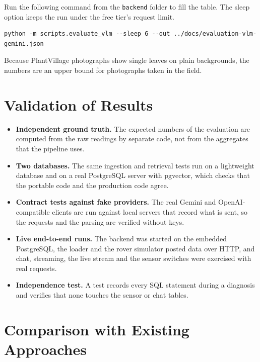 \noindent Run the following command from the \texttt{backend} folder to fill the table. The sleep option keeps the run under the free tier's request limit.

\begin{lstlisting}
python -m scripts.evaluate_vlm --sleep 6 --out ../docs/evaluation-vlm-gemini.json
\end{lstlisting}

\noindent Because PlantVillage photographs show single leaves on plain backgrounds, the
numbers are an upper bound for photographs taken in the field.

\section{Validation of Results}

\begin{itemize}
\item \textbf{Independent ground truth.} The expected numbers of the evaluation are computed from the raw readings by separate code, not
      from the aggregates that the pipeline uses.
\item \textbf{Two databases.} The same ingestion and retrieval tests run on a lightweight database and on a real PostgreSQL server with pgvector,
      which checks that the portable code and the production code agree.
\item \textbf{Contract tests against fake providers.} The real Gemini and OpenAI-compatible clients are run against local servers that
      record what is sent, so the requests and the parsing are verified without keys.
\item \textbf{Live end-to-end runs.} The backend was started on the embedded PostgreSQL, the loader and the rover simulator posted data over HTTP, and
      chat, streaming, the live stream and the sensor switches were exercised with real requests.
\item \textbf{Independence test.} A test records every SQL statement during a diagnosis and verifies that none touches the sensor or chat tables.
\end{itemize}

\section{Comparison with Existing Approaches}

